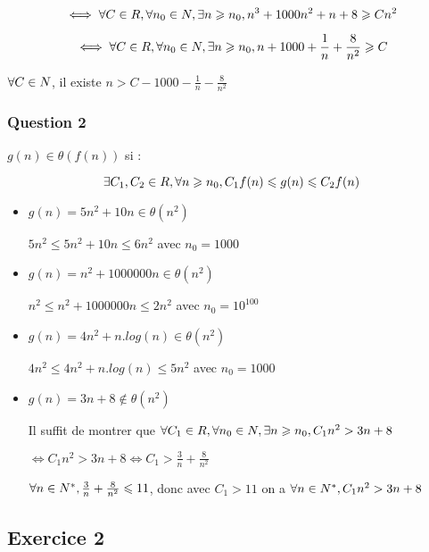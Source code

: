 \[
\iff \forall C \in \\R, \forall n_0 \in \\N, \exists n \geqslant n_0, n^3+1000n^2+n+8 \geqslant Cn^2 
\]

\[
\iff \forall C \in \\R, \forall n_0 \in \\N, \exists n \geqslant n_0, n + 1000 + \frac{1}{n} + \frac{8}{n^2} \geqslant C
\]

$\forall C \in \\N$, il existe
$n > C - 1000 - \frac{1}{n} - \frac{8}{n^2}$

\hypertarget{question-2}{%
\subsubsection{Question 2}\label{question-2}}

\(g(n) \in \theta(f(n))\) si :

\[
\exists C_1, C_2 \in \\R, \forall n \geqslant n_0, C_1f(n) \leqslant g(n) \leqslant C_2f(n)
\]

\begin{itemize}
\item
  \(g(n) = 5n^2 + 10n \in \theta(n^2)\)

  \(5n^2 \leqslant 5n^2 + 10n \leqslant 6n^2\) avec \(n_0 = 1000\)
\item
  \(g(n) = n^2 + 1000000n \in \theta(n^2)\)

  \(n^2 \leqslant n^2 + 1000000n \leqslant 2n^2\) avec
  \(n_0 = 10^{100}\)
\item
  \(g(n) = 4n^2 + n.log(n) \in \theta(n^2)\)

  \(4n^2 \leqslant 4n^2 + n.log(n) \leqslant 5n^2\) avec \(n_0 = 1000\)
\item
  \(g(n) = 3n+8 \notin \theta(n^2)\)

  Il suffit de montrer que
  \(\forall C_1\in\\R, \forall n_0 \in \\N, \exists n \geqslant n_0, C_1n^2 > 3n+8\)

  \(\iff C_1n^2>3n+8 \iff C_1 > \frac{3}{n} + \frac{8}{n^2}\)

  \(\forall n \in \\N^*, \frac{3}{n}+\frac{8}{n^2} \leqslant 11\), donc
  avec \(C_1 > 11\) on a \(\forall n \in \\N^*, C_1n^2 > 3n+8\)
\end{itemize}

\hypertarget{exercice-2}{%
\subsection{Exercice 2}\label{exercice-2}}

